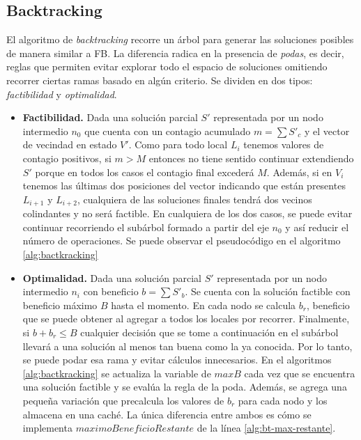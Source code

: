 \subsection{Backtracking}

El algoritmo de \textit{backtracking} recorre un árbol para generar las soluciones posibles de manera similar a FB. La diferencia radica en la presencia de \textit{podas}, es decir, reglas que permiten evitar explorar todo el espacio de soluciones omitiendo recorrer ciertas ramas basado en algún criterio. Se dividen en dos tipos: \textit{factibilidad} y \textit{optimalidad}.

\begin{itemize}
    \item \textbf{Factibilidad.} Dada una solución parcial $S'$ representada por un nodo intermedio $n_0$ que cuenta con un contagio acumulado $m=\sum S'_c$ y el vector de vecindad en estado $V'$. Como para todo local $L_i$ tenemos valores de contagio positivos, si $m>M$ entonces no tiene sentido continuar extendiendo $S'$ porque en todos los casos el contagio final excederá $M$. Además, si en $V_i$ tenemos las últimas dos posiciones del vector indicando que están presentes $L_{i+1}$ y $L_{i+2}$, cualquiera de las soluciones finales tendrá dos vecinos colindantes y no será factible. En cualquiera de los dos casos, se puede evitar continuar recorriendo el subárbol formado a partir del eje $n_0$ y así reducir el número de operaciones. Se puede observar el pseudocódigo en el algoritmo \ref{alg:bactkracking}
    \item \textbf{Optimalidad.} Dada una solución parcial $S'$ representada por un nodo intermedio $n_i$ con beneficio $b=\sum S'_b$. Se cuenta con la solución factible con beneficio máximo $B$ hasta el momento. En cada nodo se calcula $b_r$, beneficio que se puede obtener al agregar a todos los locales por recorrer. Finalmente, si $b + b_r\le B$ cualquier decisión que se tome a continuación en el subárbol llevará a una solución al menos tan buena como la ya conocida. Por lo tanto, se puede podar esa rama y evitar cálculos innecesarios. En el algoritmos \ref{alg:bactkracking} se actualiza la variable de $maxB$ cada vez que se encuentra una solución factible y se evalúa la regla de la poda. Además, se agrega una pequeña variación que precalcula los valores de $b_r$ para cada nodo y los almacena en una caché. La única diferencia entre ambos es cómo se implementa $maximoBeneficioRestante$ de la línea \ref{alg:bt-max-restante}. 
\end{itemize}

